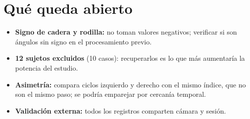 \documentclass[11pt,a4paper]{article}
\begin{document}
\section{Qué queda abierto}

\begin{itemize}
\item \textbf{Signo de cadera y rodilla:} no toman valores negativos; verificar si son ángulos sin signo en el procesamiento previo.
\item \textbf{12 sujetos excluidos} (10 casos): recuperarlos es lo que más aumentaría la potencia del estudio.
\item \textbf{Asimetría:} compara ciclos izquierdo y derecho con el mismo índice, que no son el mismo paso; se podría emparejar por cercanía temporal.
\item \textbf{Validación externa:} todos los registros comparten cámara y sesión.
\end{itemize}
\end{document}
